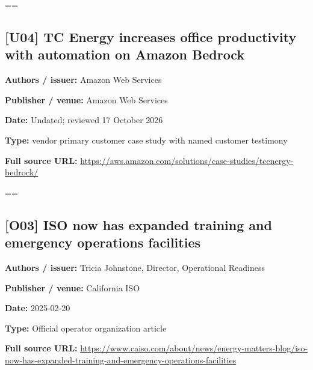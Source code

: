 \documentclass[10pt,letterpaper]{article}
\begin{document}
\egroup\par\noindent\box\readingEntry\par\medskip
\setbox\readingEntry=\vbox\bgroup\hsize=\linewidth\subsection*{[U04] TC Energy increases office productivity with automation on Amazon Bedrock}
\textbf{Authors / issuer:} Amazon Web Services\par
\textbf{Publisher / venue:} Amazon Web Services\par
\textbf{Date:} Undated; reviewed 17 October 2026\par
\textbf{Type:} vendor primary customer case study with named customer testimony\par
\textbf{Full source URL:} \href{https://aws.amazon.com/solutions/case-studies/tcenergy-bedrock/}{\small\ttfamily https:/\allowbreak{}/\allowbreak{}aws.\allowbreak{}amazon.\allowbreak{}com/\allowbreak{}solutions/\allowbreak{}case-\allowbreak{}studies/\allowbreak{}tcenergy-\allowbreak{}bedrock/\allowbreak{}}\par
\egroup\par\noindent\box\readingEntry\par\medskip
\setbox\readingEntry=\vbox\bgroup\hsize=\linewidth\subsection*{[O03] ISO now has expanded training and emergency operations facilities}
\textbf{Authors / issuer:} Tricia Johnstone, Director, Operational Readiness\par
\textbf{Publisher / venue:} California ISO\par
\textbf{Date:} 2025-02-20\par
\textbf{Type:} Official operator organization article\par
\textbf{Full source URL:} \href{https://www.caiso.com/about/news/energy-matters-blog/iso-now-has-expanded-training-and-emergency-operations-facilities}{\small\ttfamily https:/\allowbreak{}/\allowbreak{}www.\allowbreak{}caiso.\allowbreak{}com/\allowbreak{}about/\allowbreak{}news/\allowbreak{}energy-\allowbreak{}matters-\allowbreak{}blog/\allowbreak{}iso-\allowbreak{}now-\allowbreak{}has-\allowbreak{}expanded-\allowbreak{}training-\allowbreak{}and-\allowbreak{}emergency-\allowbreak{}operations-\allowbreak{}facilities}\par
\egroup\par\noindent\box\readingEntry\par\medskip
\end{document}
